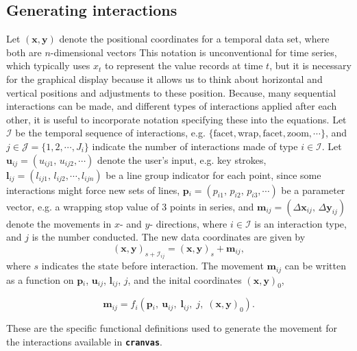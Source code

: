 \documentclass[12pt]{article}
\begin{document}
\subsection{Generating interactions\label{interaction-formulas}}

Let $(\mathbf{x},\mathbf{y})$ denote the positional coordinates
for a temporal data set, where both are $n$-dimensional vectors
This notation is unconventional for time series, which typically
uses $x_t$ to represent the value records at time $t$, but it is
necessary for the graphical display because it allows us to think
about horizontal and vertical positions and adjustments to these
position. Because, many sequential interactions can be made, and
different types of interactions applied after each other, it is
useful to incorporate notation specifying these into the equations.
Let $\mathcal{I}$ be the temporal sequence of interactions,
e.g. $\{\textrm{facet},\textrm{wrap},\textrm{facet},
\textrm{zoom},\cdots\}$, and $j\in\mathcal{J}=\{1,2,\cdots,
J_{i}\}$ indicate the number of interactions made of type $i\in
\mathcal{I}$. Let $\mathbf{u}{}_{ij}=(u_{ij1},\, u_{ij2},\cdots)$
denote the user's input, e.g. key strokes, 
$\mathbf{l}{}_{ij}=(l_{ij1},\, l_{ij2},\cdots, l_{ijn})$
be a line group indicator for each point, since some interactions might force new sets of lines, 
$\mathbf{p}{}_{i}=(p_{i1},\, p_{i2},\, p_{i3},\cdots)$
be a parameter vector, e.g. a wrapping stop value of 3 points in series, and 
$\mathbf{m}{}_{ij}=(\Delta\mathbf{x}{}_{ij},\,\Delta\mathbf{y}_{ij})$
denote the movements in $x$- and $y$- directions, where $i\in\mathcal{I}$
is an interaction type, and $j$ is the number conducted. 
The new data coordinates are given by 
\[
(\mathbf{x},\mathbf{y})_{s+\mathcal{I}_{ij}}=(\mathbf{x},\mathbf{y})_{s}+\mathbf{m}{}_{ij},
\]
where $s$ indicates the state before interaction.
The movement $\mathbf{m}{}_{ij}$ can be written as a function on $\mathbf{p}{}_{i}$,
$\mathbf{u}{}_{ij}$, $\mathbf{l}_{ij}$, $j$, and the inital
coordinates $(\mathbf{x},\mathbf{y})_0$, 

\[
\mathbf{m}{}_{ij}=f_{i}(\mathbf{p}{}_{i},\:\mathbf{u}{}_{ij},\;\mathbf{l}_{ij},\; j,\; (\mathbf{x},\mathbf{y})_{0} ).
\]

\noindent These are the specific functional definitions used to generate the movement for the interactions available in \texttt{\textbf{cranvas}}. 
\end{document}
